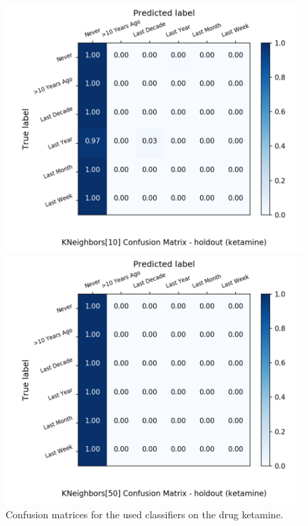 \begin{figure}[H]
\begin{minipage}[b]{0.32\textwidth}
		\includegraphics[width=1.1\textwidth]{Plots/ketamine_KNeighbors_10_balance_False_holdout.png}
  \end{minipage}
	\begin{minipage}[b]{0.32\textwidth}
		\includegraphics[width=1.1\textwidth]{Plots/ketamine_KNeighbors_50_balance_False_holdout.png}
  \end{minipage}
	\caption{Confusion matrices for the used classifiers on the drug ketamine.}
\end{figure}

